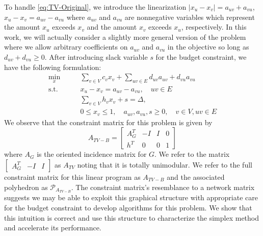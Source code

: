 \documentclass[titlepage,11pt]{article}
\begin{document}
To handle \eqref{eq:TV-Original}, we introduce the linearization $|x_u - x_v| = a_{uv} + a_{vu}$, $x_u - x_v = a_{uv} - a_{vu}$ where $a_{uv}$ and $a_{vu}$ are nonnegative variables which represent the amount $x_u$ exceeds $x_v$ and the amount $x_v$ exceeds $x_u$, respectively. In this work, we will actually consider a slightly more general version of the problem where we allow arbitrary coefficients on $a_{uv}$ and $a_{vu}$ in the objective so long as $d_{uv} + d_{vu} \ge 0$.
After introducing slack variable $s$ for the budget constraint, we have the following formulation:
\begin{equation}\label{eq:TV-Linear}
\begin{aligned}
    \min_{x} \qquad &\sum_{v \in V} c_v x_v + \sum_{uv \in E}d_{uv}a_{uv} + d_{vu} a_{vu} \\
    \text{s.t.} \qquad & x_u - x_v = a_{uv} - a_{vu},  \quad uv \in E\\
                        &\sum_{v\in V}h_v x_v + s = \Delta,\\
                        & 0 \le x_v \le 1,\quad  a_{uv}, a_{vu}, s \ge 0, \quad v \in V, uv \in E
\end{aligned}
\end{equation}
We observe that the constraint matrix for this problem is given by
\begin{equation}
A_{TV-B} = \begin{bmatrix}
    A_G^T & -I & I & 0 \\
    h^T & 0 & 0 & 1
\end{bmatrix}
\end{equation}
where $A_G$ is the oriented incidence matrix for $G$. We refer to the matrix $\begin{bmatrix}A_G^T & -I & I \end{bmatrix}$ as $A_{TV}$ noting that it is totally unimodular. We refer to the full constraint matrix for this linear program as $A_{TV-B}$ and the associated polyhedron as $\mathcal{P}_{A_{TV-B}}$.
The constraint matrix's resemblance to a network matrix suggests we may be able to exploit this graphical structure with appropriate care for the budget constraint to develop algorithms for this problem. We show that this intuition is correct and use this structure to characterize the simplex method and accelerate its performance.
\end{document}
